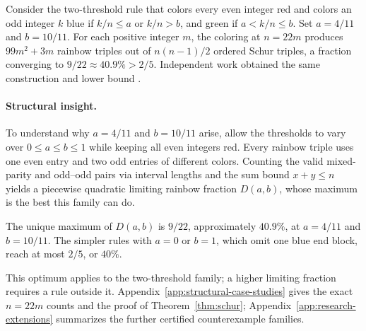 Consider the two-threshold rule that colors every even integer red and colors an odd integer $k$ blue if $k/n\le a$ or $k/n>b$, and green if $a<k/n\le b$. Set $a=4/11$ and $b=10/11$. For each positive integer $m$, the coloring at $n=22m$ produces $99m^2+3m$ rainbow triples out of $n(n-1)/2$ ordered Schur triples, a fraction converging to $9/22\approx 40.9\% > 2/5$. Independent work obtained the same construction and lower bound \citep{hegde2026somewhat}.

\paragraph{Structural insight.}
To understand why $a=4/11$ and $b=10/11$ arise, allow the thresholds to vary over $0\le a\le b\le1$ while keeping all even integers red. Every rainbow triple uses one even entry and two odd entries of different colors. Counting the valid mixed-parity and odd--odd pairs via interval lengths and the sum bound $x+y\le n$ yields a piecewise quadratic limiting rainbow fraction $D(a,b)$, whose maximum is the best this family can do.

\begin{theorem}
\label{thm:schur}
The unique maximum of $D(a,b)$ is $9/22$, approximately $40.9\%$, at $a=4/11$ and $b=10/11$. The simpler rules with $a=0$ or $b=1$, which omit one blue end block, reach at most $2/5$, or $40\%$.
\end{theorem}
This optimum applies to the two-threshold family; a higher limiting fraction requires a rule outside it. Appendix~\ref{app:structural-case-studies} gives the exact $n=22m$ counts and the proof of Theorem~\ref{thm:schur}; Appendix~\ref{app:research-extensions} summarizes the further certified counterexample families.
